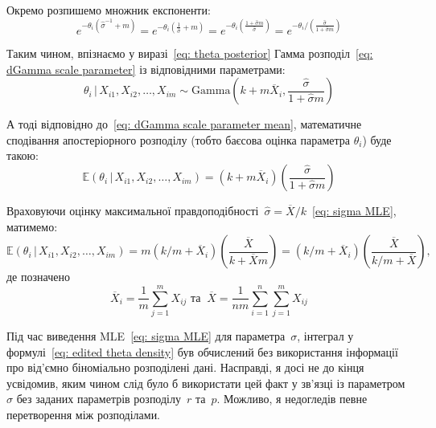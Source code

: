Окремо розпишемо множник експоненти:
\begin{equation}
    e^{-\theta_{i}(\widehat{\sigma}^{-1}+m)} = e^{-\theta_{i}\left( \frac{1}{\widehat{\sigma}}+m \right)} = e^{-\theta_{i}\left( \frac{1+\widehat{\sigma}m}{\widehat{\sigma}} \right)} = e^{-\theta_{i}/\left( \frac{\widehat{\sigma}}{1+\widehat{\sigma}m} \right)}
\end{equation}

Таким чином, впізнаємо у виразі~\eqref{eq: theta posterior} Гамма розподіл~\eqref{eq: dGamma scale parameter} із відповідними параметрами:
\begin{equation}
    \theta_i \,|\, X_{i1},X_{i2},\ldots,X_{im} \sim \mathrm{Gamma}\left( k+m\overline{X}_i,\frac{\widehat{\sigma}}{1+\widehat{\sigma}m} \right)
\end{equation}

А тоді відповідно до~\eqref{eq: dGamma scale parameter mean}, математичне сподівання апостеріорного розподілу (тобто баєсова оцінка параметра $\theta_{i}$) буде такою:
\begin{equation}
    \mathbb{E}(\theta_i \,|\, X_{i1},X_{i2},\ldots,X_{im}) = \left( k+m\overline{X}_i \right)\left( \frac{\widehat{\sigma}}{1+\widehat{\sigma}m} \right)
\end{equation}

Враховуючи оцінку максимальної правдоподібності~$\widehat{\sigma}=\overline{X}/k$~\eqref{eq: sigma MLE}, матимемо:
\begin{equation}\label{eq: my BE}
    \mathbb{E}(\theta_i \,|\, X_{i1},X_{i2},\ldots,X_{im}) = m\left( k/m+\overline{X}_i \right)\left( \frac{\overline{X}}{k+\overline{X}m} \right) = \left( k/m+\overline{X}_i \right)\left( \frac{\overline{X}}{k/m+\overline{X}} \right),
\end{equation}
де позначено
\begin{equation}
    \overline{X}_i = \frac{1}{m} \sum\limits_{j=1}^{m} X_{ij} \text{ та } \    \overline{X} = \frac{1}{nm}\sum\limits_{i=1}^{n} \sum\limits_{j=1}^{m} X_{ij}
\end{equation}

\begin{remark}
    Під час виведення MLE~\eqref{eq: sigma MLE} для параметра~$\sigma$, інтеграл у формулі~\eqref{eq: edited theta density} був обчислений без використання інформації про від'ємно біноміально розподілені дані. Насправді, я досі не до кінця усвідомив, яким чином слід було б використати цей факт у зв'язці із параметром~$\sigma$ без заданих параметрів розподілу~$r$ та~$p$. Можливо, я недогледів певне перетворення між розподілами.
\end{remark}